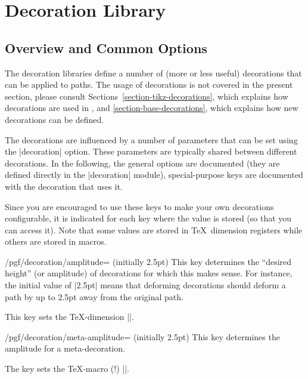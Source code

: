 %
%
%

\section{Decoration Library}
\label{section-library-decorations}



\subsection{Overview and Common Options}

The decoration libraries define a number of (more or less useful)
decorations that can be applied to paths. The usage of decorations is
not covered in the present section, please consult
Sections~\ref{section-tikz-decorations}, which explains how
decorations are used in \tikzname, and
\ref{section-base-decorations}, which  explains how new
decorations can be defined.

The decorations are influenced by a number of parameters that can be
set using the |decoration| option. These parameters are
typically shared between different decorations. In the following, the
general options are documented (they are defined directly in the
|decoration| module), special-purpose keys are documented
with the decoration that uses it.

Since you are encouraged to use these keys to make your own
decorations configurable, it is indicated for each key where the value
is stored (so that you can access it). Note that some values are
stored in \TeX\ dimension registers while others are stored in macros.

\begin{key}{/pgf/decoration/amplitude= (initially 2.5pt)}
  This key determines the ``desired height'' (or amplitude) of
  decorations for which this makes sense. For instance, the initial
  value of |2.5pt| means that deforming decorations should deform a
  path by up to 2.5pt away from the original path.

  This key sets the \TeX-dimension |\pgfdecorationsegmentamplitude|.
\end{key}

\begin{key}{/pgf/decoration/meta-amplitude= (initially 2.5pt)}
  This key determines the amplitude for a meta-decoration.

  The key sets the \TeX-macro (!) |\pgfmetadecorationsegmentamplitude|.
\end{key}

